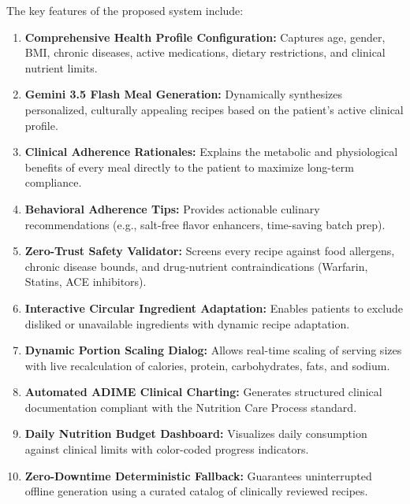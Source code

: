 \documentclass[a4paper,12pt]{report}
\begin{document}
The key features of the proposed system include:
\begin{enumerate}
\item \textbf{Comprehensive Health Profile Configuration:} Captures age, gender, BMI, chronic diseases, active medications, dietary restrictions, and clinical nutrient limits.

\item \textbf{Gemini 3.5 Flash Meal Generation:} Dynamically synthesizes personalized, culturally appealing recipes based on the patient's active clinical profile.

\item \textbf{Clinical Adherence Rationales:} Explains the metabolic and physiological benefits of every meal directly to the patient to maximize long-term compliance.

\item \textbf{Behavioral Adherence Tips:} Provides actionable culinary recommendations (e.g., salt-free flavor enhancers, time-saving batch prep).

\item \textbf{Zero-Trust Safety Validator:} Screens every recipe against food allergens, chronic disease bounds, and drug-nutrient contraindications (Warfarin, Statins, ACE inhibitors).

\item \textbf{Interactive Circular Ingredient Adaptation:} Enables patients to exclude disliked or unavailable ingredients with dynamic recipe adaptation.

\item \textbf{Dynamic Portion Scaling Dialog:} Allows real-time scaling of serving sizes with live recalculation of calories, protein, carbohydrates, fats, and sodium.

\item \textbf{Automated ADIME Clinical Charting:} Generates structured clinical documentation compliant with the Nutrition Care Process standard.

\item \textbf{Daily Nutrition Budget Dashboard:} Visualizes daily consumption against clinical limits with color-coded progress indicators.

\item \textbf{Zero-Downtime Deterministic Fallback:} Guarantees uninterrupted offline generation using a curated catalog of clinically reviewed recipes.
\end{enumerate}

\end{document}
